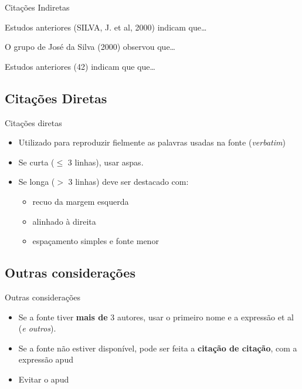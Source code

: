\documentclass{beamer}
\begin{document}
\begin{frame}{Citações Indiretas}
  \begin{example}
    Estudos anteriores \alert{(SILVA, J. et al, 2000)} indicam
    que\ldots
  \end{example}
  \begin{example}
    O grupo de José da Silva \alert{(2000)} observou que\ldots
  \end{example}
  \begin{example}
    Estudos anteriores \alert{(42)} indicam que que\ldots
  \end{example}
\end{frame}

\subsection{Citações Diretas}

\begin{frame}{Citações diretas}
  \begin{itemize}
  \item Utilizado para reproduzir fielmente as palavras usadas na
    fonte ({\em verbatim})
  \item Se curta ($\leq$ 3 linhas), usar aspas.
  \item Se longa ($>$ 3 linhas) deve ser destacado com:
    \begin{itemize}
    \item recuo da margem esquerda
    \item alinhado à direita
    \item espaçamento simples e fonte menor
    \end{itemize}
  \end{itemize}
\end{frame}

\subsection{Outras considerações}

\begin{frame}{Outras considerações}
  \begin{itemize}
  \item Se a fonte tiver {\bf mais de} 3 autores, usar o primeiro nome
    e a expressão \alert{et al} ({\em e outros}).
  \item Se a fonte não estiver disponível, pode ser feita a {\bf
      citação de citação}, com a expressão \alert{apud}
  \item Evitar o apud
  \end{itemize}
\end{frame}
\end{document}
